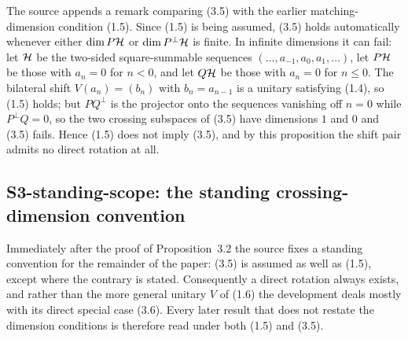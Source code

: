 The source appends a remark comparing (3.5) with the earlier matching-dimension condition (1.5).  Since (1.5) is being assumed, (3.5) holds automatically whenever either $\dim P\mathcal{H}$ or $\dim P^\perp\mathcal{H}$ is finite.  In infinite dimensions it can fail: let $\mathcal{H}$ be the two-sided square-summable sequences $(\ldots,a_{-1},a_0,a_1,\ldots)$, let $P\mathcal{H}$ be those with $a_n=0$ for $n<0$, and let $Q\mathcal{H}$ be those with $a_n=0$ for $n\le0$.  The bilateral shift $V(a_n)=(b_n)$ with $b_n=a_{n-1}$ is a unitary satisfying (1.4), so (1.5) holds; but $PQ^\perp$ is the projector onto the sequences vanishing off $n=0$ while $P^\perp Q=0$, so the two crossing subspaces of (3.5) have dimensions $1$ and $0$ and (3.5) fails.  Hence (1.5) does not imply (3.5), and by this proposition the shift pair admits no direct rotation at all.

\subsection*{S3-standing-scope: the standing crossing-dimension convention}
Immediately after the proof of Proposition~3.2 the source fixes a standing convention for the remainder of the paper: (3.5) is assumed as well as (1.5), except where the contrary is stated.  Consequently a direct rotation always exists, and rather than the more general unitary $V$ of (1.6) the development deals mostly with its direct special case (3.6).  Every later result that does not restate the dimension conditions is therefore read under both (1.5) and (3.5).

